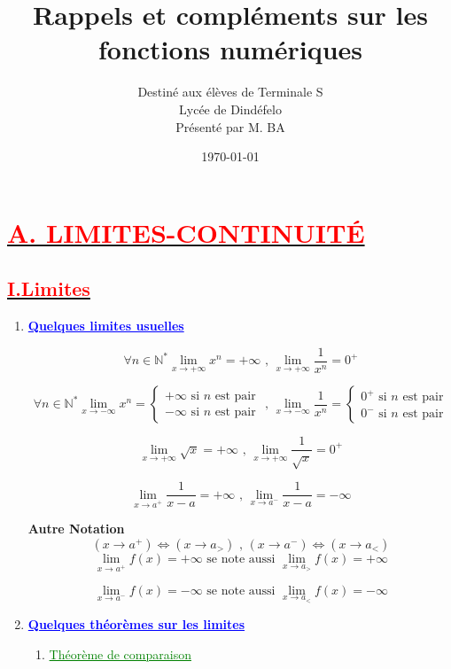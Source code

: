 \documentclass[12pt]{article}
\author{Destiné aux élèves de Terminale S\\Lycée de Dindéfelo\\Présenté par M. BA}
\title{\textbf{Rappels et compléments sur les fonctions numériques}}
\date{\today}
\begin{document}
\maketitle
\section*{\underline{\textbf{\textcolor{red}{A. LIMITES-CONTINUITÉ}}}}
\subsection*{\underline{\textbf{\textcolor{red}{I.Limites}}}}

\renewcommand{\labelenumi}{\theenumi)}
\begin{enumerate}[label=\arabic*)]
    \item \textbf{\textcolor{blue}{\underline{Quelques limites usuelles}}}
    
\[\forall n\in\mathbb{N}^{*} \lim_{x \to +\infty} x^{n}=+\infty  \text{ , } \lim_{x \to +\infty} \frac{1}{x^{n}}=0^{+}  \]

\[ \forall n\in\mathbb{N}^{*}
 \lim_{x \to -\infty} x^{n} =
 \begin{cases} 
 +\infty \text{ si \(n\) est pair}\\
 -\infty \text{ si \(n\) est pair}
 \end{cases}
\text{ , }
\lim_{x \to -\infty} \frac{1}{x^{n}}=
 \begin{cases} 
 0^{+} \text{ si \(n\) est pair}\\
 0^{-} \text{ si \(n\) est pair}
 \end{cases}
\]

\[ \lim_{x \to +\infty} \sqrt{x}=+\infty \text{ , } \lim_{x \to +\infty} \frac{1}{\sqrt{x}}=0^{+}  \]

\[ \lim_{x \to a^{+}} \frac{1}{x-a}=+\infty \text{ , } \lim_{x \to a^{-}} \frac{1}{x-a}=-\infty  \]

		\textbf{Autre Notation}
\[( x\rightarrow a^{+} ) \Leftrightarrow ( x\rightarrow a_{>} ) \text{ , } ( x\rightarrow a^{-} ) \Leftrightarrow ( x\rightarrow a_{<} ) \]
\[ \lim_{x \to a^{+}} f(x)=+\infty \text{ se note aussi } \lim_{x \to a_{>}} f(x)=+\infty  \]	

\[ \lim_{x \to a^{-}} f(x)=-\infty \text{ se note aussi } \lim_{x \to a_{<}} f(x)=-\infty  \]	
    
    \item	\textbf{\textcolor{blue}{\underline{Quelques théorèmes sur les limites}}}
\begin{enumerate}[label=\alph*)]
       \item \textcolor{green}{\underline{Théorème de comparaison}}
       

\end{enumerate}
\end{enumerate}
\end{document}
